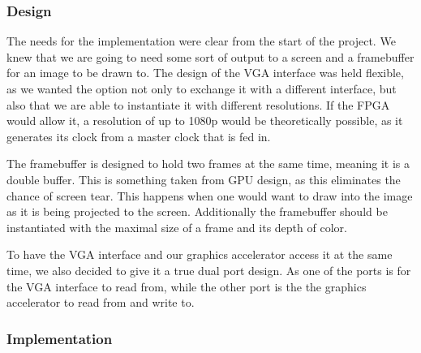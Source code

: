 \subsubsection*{Design}\label{subsubsec:des_buff}
The needs for the implementation were clear from the start of the project. We knew that we are going to need some sort of output to a screen and a framebuffer for an  image to be drawn to. The design of the VGA interface was held flexible, as we wanted the option not only to exchange it with a different interface, but also that we are able to instantiate it with different resolutions. If the FPGA would allow it, a resolution of up to 1080p would be theoretically possible, as it generates its clock from a master clock that is fed in.

The framebuffer is designed to hold two frames at the same time, meaning it is a double buffer. This is something taken from GPU design, as this eliminates the chance of screen tear. This happens when one would want to draw into the image as it is being projected to the screen. Additionally the framebuffer should be instantiated with the maximal size of a frame and its depth of color.

To have the VGA interface and our graphics accelerator access it at the same time, we also decided to give it a true dual port design. As one of the ports is for the VGA interface to read from, while the other port is the the graphics accelerator to read from and write to.


\subsubsection*{Implementation}


